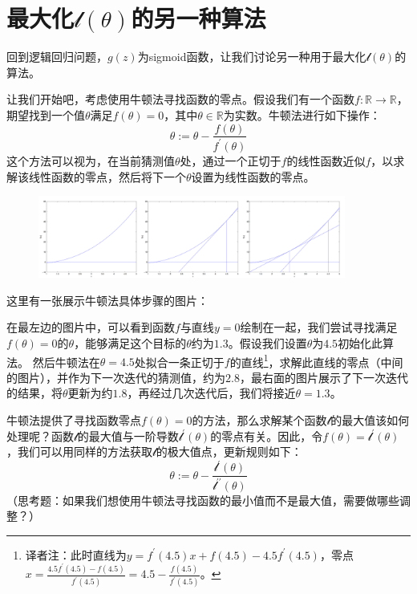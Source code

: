 \section{最大化$\mathcal{l}(\theta)$的另一种算法}

回到逻辑回归问题，$g(z)$为sigmoid函数，让我们讨论另一种用于最大化$\mathcal{l}(\theta)$的算法。

让我们开始吧，考虑使用牛顿法寻找函数的零点。假设我们有一个函数$f:\mathbb{R}\rightarrow\mathbb{R}$，期望找到一个值$\theta$满足$f(\theta)=0$，其中$\theta \in \mathbb{R}$为实数。牛顿法进行如下操作：
$$
  \theta := \theta - \frac{f(\theta)}{f^\prime(\theta)}
$$
这个方法可以视为，在当前猜测值$\theta$处，通过一个正切于$f$的线性函数近似$f$，以求解该线性函数的零点，然后将下一个$\theta$设置为线性函数的零点。

\begin{figure}
  \begin{center}
    \includegraphics[width=0.9\textwidth]{imgs/2.4_newton.jpg}
  \end{center}
\end{figure}

这里有一张展示牛顿法具体步骤的图片：

在最左边的图片中，可以看到函数$f$与直线$y=0$绘制在一起，我们尝试寻找满足$f(\theta)=0$的$\theta$，能够满足这个目标的$\theta$约为$1.3$。假设我们设置$\theta$为$4.5$初始化此算法。
然后牛顿法在$\theta=4.5$处拟合一条正切于$f$的直线\footnote{译者注：此时直线为$y=f^{\prime}(4.5)x+f(4.5)-4.5f^{\prime}(4.5)$，零点$x=\frac{4.5f^{\prime}(4.5)-f(4.5)}{f^{\prime}(4.5)}=4.5-\frac{f(4.5)}{f^{\prime}(4.5)}$。}，求解此直线的零点（中间的图片），并作为下一次迭代的猜测值，约为$2.8$，最右面的图片展示了下一次迭代的结果，将$\theta$更新为约$1.8$，再经过几次迭代后，我们将接近$\theta=1.3$。

牛顿法提供了寻找函数零点$f(\theta)=0$的方法，那么求解某个函数$\mathcal{l}$的最大值该如何处理呢？函数$\mathcal{l}$的最大值与一阶导数$\mathcal{l}^{\prime}(\theta)$的零点有关。因此，令$f(\theta)=\mathcal{l}^{\prime}(\theta)$，我们可以用同样的方法获取$\mathcal{l}$的极大值点，更新规则如下：
$$
\theta:=\theta-\frac{\mathcal{l}^{\prime}(\theta)}{\mathcal{l}^{\prime \prime}(\theta)}
$$
（思考题：如果我们想使用牛顿法寻找函数的最小值而不是最大值，需要做哪些调整？）

